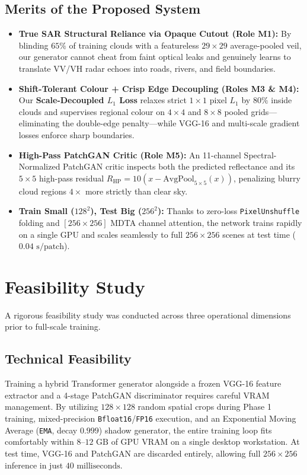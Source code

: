 \documentclass[12pt,a4paper]{report}
\begin{document}
\subsection{Merits of the Proposed System}
\begin{itemize}
    \item \textbf{True SAR Structural Reliance via Opaque Cutout (Role M1):} By blinding $65\%$ of training clouds with a featureless $29\times 29$ average-pooled veil, our generator cannot cheat from faint optical leaks and genuinely learns to translate VV/VH radar echoes into roads, rivers, and field boundaries.
    \item \textbf{Shift-Tolerant Colour + Crisp Edge Decoupling (Roles M3 \& M4):} Our \textbf{Scale-Decoupled $L_1$ Loss} relaxes strict $1\times 1$ pixel $L_1$ by $80\%$ inside clouds and supervises regional colour on $4\times 4$ and $8\times 8$ pooled grids---eliminating the double-edge penalty---while VGG-16 and multi-scale gradient losses enforce sharp boundaries.
    \item \textbf{High-Pass PatchGAN Critic (Role M5):} An 11-channel Spectral-Normalized PatchGAN critic inspects both the predicted reflectance and its $5\times 5$ high-pass residual $R_{\text{HP}} = 10(x - \text{AvgPool}_{5\times 5}(x))$, penalizing blurry cloud regions $4\times$ more strictly than clear sky.
    \item \textbf{Train Small ($128^2$), Test Big ($256^2$):} Thanks to zero-loss \texttt{PixelUnshuffle} folding and $[256\times 256]$ MDTA channel attention, the network trains rapidly on a single GPU and scales seamlessly to full $256\times 256$ scenes at test time ($0.04\text{ s/patch}$).
\end{itemize}

\section{Feasibility Study}
A rigorous feasibility study was conducted across three operational dimensions prior to full-scale training.

\subsection{Technical Feasibility}
Training a hybrid Transformer generator alongside a frozen VGG-16 feature extractor and a 4-stage PatchGAN discriminator requires careful VRAM management. By utilizing $128\times 128$ random spatial crops during Phase 1 training, mixed-precision \texttt{Bfloat16}/\texttt{FP16} execution, and an Exponential Moving Average (\texttt{EMA}, decay $0.999$) shadow generator, the entire training loop fits comfortably within $8$--$12\text{ GB}$ of GPU VRAM on a single desktop workstation. At test time, VGG-16 and PatchGAN are discarded entirely, allowing full $256\times 256$ inference in just $40\text{ milliseconds}$.
\end{document}
